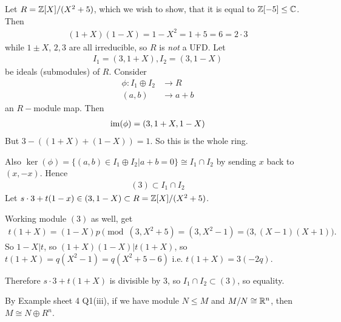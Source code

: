 \documentclass[a4paper]{article}
\begin{document}
\begin{eg}
Let $R=\mathbb{Z}[X]/(X^2+5)$, which we wish to show, that it is equal to $\mathbb{Z}[-5] \leq \mathbb{C}$. Then
\begin{equation*}
\begin{aligned}
(1+X)(1-X) =1-X^2 = 1+5 = 6 = 2 \cdot 3
\end{aligned}
\end{equation*}
while $1 \pm X$, $2,3$ are all irreducible, so $R$ is \emph{not} a UFD. Let 
\begin{equation*}
\begin{aligned}
I_1 = (3,1+X), I_2 =(3,1-X)
\end{aligned}
\end{equation*}
be ideals (submodules) of $R$. Consider
\begin{equation*}
\begin{aligned}
\phi: I_1 \oplus I_2 &\to R\\
(a,b) &\to a+b
\end{aligned}
\end{equation*}
an $R-$module map. Then
\begin{equation*}
\begin{aligned}
\operatorname{im}(\phi) = (3,1+X,1-X)
\end{aligned}
\end{equation*}
But $3-((1+X)+(1-X))=1$. So this is the whole ring.

Also $\ker(\phi) = \{(a,b) \in I_1 \oplus I_2 | a+b=0\} \cong I_1 \cap I_2$ by sending $x$ back to $(x,-x)$. Hence
\begin{equation*}
\begin{aligned}
(3) \subset I_1 \cap I_2
\end{aligned}
\end{equation*}
Let $s \cdot 3 + t(1-x) \in (3,1-X) \subset R=\mathbb{Z}[X] / (X^2+5)$.

Working module $(3)$ as well, get
\begin{equation*}
\begin{aligned}
t(1+X) = (1-X)p \pmod {(3,X^2+5) = (3,X^2-1) = (3,(X-1)(X+1)}.
\end{aligned}
\end{equation*}
So $1-X|t$, so $(1+X)(1-X)|t(1+X)$, so $t(1+X)=q(X^2-1)=q(X^2+5-6)$ i.e. $t(1+X) = 3(-2q)$.

Therefore $s \cdot 3 + t(1+X)$ is divisible by $3$, so $I_1 \cap I_2 \subset (3)$, so equality.

By Example sheet 4 Q1(iii), if we have module $N \leq M$ and $M/N \cong \mathbb{R}^n$, then $M \cong N \oplus R^n$.


\end{eg}
\end{document}
